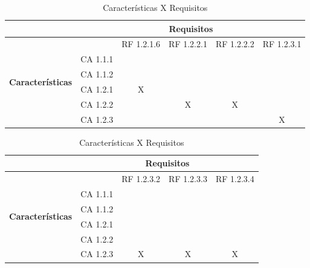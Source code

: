 \begin{table}[!h]
\centering
\caption{Características X Requisitos}
\label{Características_X_Requisitos_5}
\begin{tabular}{|c|c|c|c|c|c|}
\hline
  & \multicolumn{5}{c|}{\textbf{Requisitos}}                    \\ \hline
    \multirow{6}{*}{\textbf{Características}} &   & RF 1.2.1.6 & RF 1.2.2.1 & RF 1.2.2.2 & RF 1.2.3.1 \\ \cline{2-6}
                                       & CA 1.1.1 &            &            &            &           \\ \cline{2-6}
                                       & CA 1.1.2 &            &            &            &           \\ \cline{2-6}
                                       & CA 1.2.1 & X          &            &            &           \\ \cline{2-6}
                                       & CA 1.2.2 &            & X          & X          &           \\ \cline{2-6}
                                       & CA 1.2.3 &            &            &            & X         \\ \hline
\end{tabular}
\end{table}


\begin{table}[!h]
\centering
\caption{Características X Requisitos}
\label{Características_X_Requisitos_6}
\begin{tabular}{|c|c|c|c|c|}
\hline
  & \multicolumn{4}{c|}{\textbf{Requisitos}}                    \\ \hline
    \multirow{6}{*}{\textbf{Características}} &   & RF 1.2.3.2 & RF 1.2.3.3 & RF 1.2.3.4 \\ \cline{2-5}
                                       & CA 1.1.1 &            &            &            \\ \cline{2-5}
                                       & CA 1.1.2 &            &            &            \\ \cline{2-5}
                                       & CA 1.2.1 &            &            &            \\ \cline{2-5}
                                       & CA 1.2.2 &            &            &            \\ \cline{2-5}
                                       & CA 1.2.3 & X          & X          & X          \\ \hline
\end{tabular}
\end{table}




